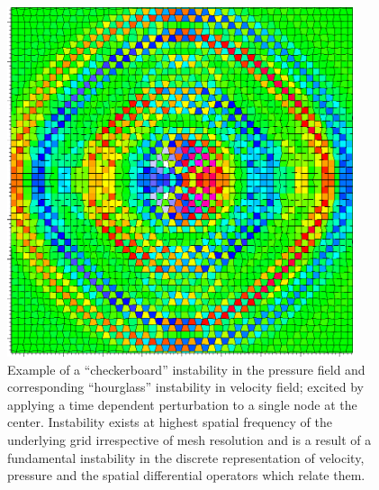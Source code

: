 \begin{figure}[h!]
 \centering
 \includegraphics[width=4in,keepaspectratio=true]{./Figures/HGExample.png}
 \caption{Example of a “checkerboard” instability in the pressure field and corresponding “hourglass” instability in velocity field; excited by applying a time dependent perturbation to a single node at the center. Instability exists at highest spatial frequency of the underlying grid irrespective
of mesh resolution and is a result of a fundamental instability in the discrete representation of velocity, pressure and the spatial differential operators which relate them.}
 \label{fig:HGExample}
\end{figure}

